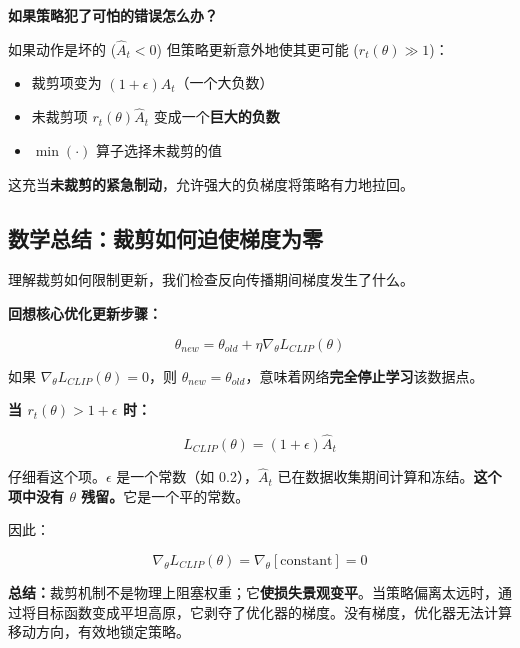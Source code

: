 \documentclass[12pt,a4paper]{article}
\theoremstyle{noteplain}
\theoremstyle{noteexercise}
\begin{document}
\textbf{如果策略犯了可怕的错误怎么办？}

如果动作是坏的 ($\hat{A}_t < 0$) 但策略更新意外地使其更可能 ($r_t(\theta) \gg1$)：
\begin{itemize}
  \setlength{\itemsep}{0.2em}
  \item 裁剪项变为 $(1+\epsilon)\hat{A}_t$（一个大负数）
  \item 未裁剪项 $r_t(\theta)\hat{A}_t$ 变成一个\textbf{巨大的负数}
  \item $\min(\cdot)$ 算子选择未裁剪的值
\end{itemize}

这充当\textbf{未裁剪的紧急制动}，允许强大的负梯度将策略有力地拉回。

\subsection{数学总结：裁剪如何迫使梯度为零}

理解裁剪如何限制更新，我们检查反向传播期间梯度发生了什么。

\textbf{回想核心优化更新步骤：}

\begin{equation}\label{eq:update-step}
  \theta_{new} = \theta_{old} + \eta \nabla_\theta L_{CLIP}(\theta)
\end{equation}

如果 $\nabla_\theta L_{CLIP}(\theta) = 0$，则 $\theta_{new} = \theta_{old}$，意味着网络\textbf{完全停止学习}该数据点。

\textbf{当 $r_t(\theta) > 1+\epsilon$ 时：}

\begin{equation}\label{eq:clipped-constant}
  L_{CLIP}(\theta) = (1+\epsilon) \hat{A}_t
\end{equation}

仔细看这个项。$\epsilon$ 是一个常数（如 0.2），$\hat{A}_t$ 已在数据收集期间计算和冻结。\textbf{这个项中没有 $\theta$ 残留。}它是一个平的常数。

因此：

\begin{equation}\label{eq:grad-zero}
  \nabla_\theta L_{CLIP}(\theta) = \nabla_\theta [\text{constant}] = 0
\end{equation}

\textbf{总结：}裁剪机制不是物理上阻塞权重；它\textbf{使损失景观变平}。当策略偏离太远时，通过将目标函数变成平坦高原，它剥夺了优化器的梯度。没有梯度，优化器无法计算移动方向，有效地锁定策略。

\end{document}
